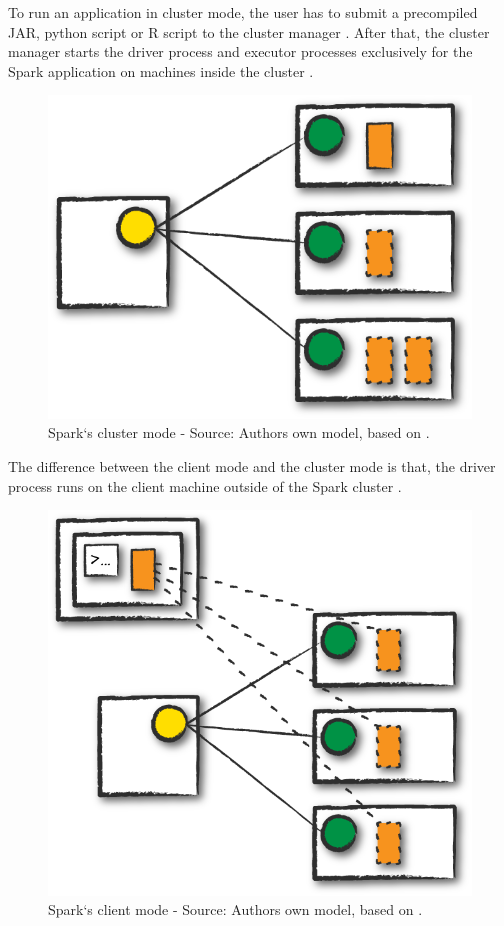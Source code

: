 To run an application in cluster mode, the user has to submit a precompiled JAR, python script or R script to the cluster manager \cite{Chambers2018Spark}. After that, the cluster manager starts the driver process and executor processes exclusively for the Spark application on machines inside the cluster \cite{Chambers2018Spark, Hien2018Spark}.
\begin{figure}[h]%
\centering
\includegraphics[scale=0.5]{images/03_background/cluster_mode}%
\caption{Spark`s cluster mode - Source: Authors own model, based on \cite{Chambers2018Spark}.}%
\label{fig:spark_cluster_mode}%
\end{figure}

The difference between the client mode and the cluster mode is that, the driver process runs on the client machine outside of the Spark cluster \cite{Chambers2018Spark}.
\begin{figure}[h]%
\centering
\includegraphics[scale=0.5]{images/03_background/client_mode}%
\caption{Spark`s client mode - Source: Authors own model, based on \cite{Chambers2018Spark}.}%
\label{fig:spark_client_mode}%
\end{figure}

